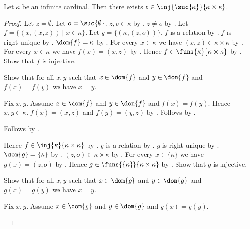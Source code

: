 \begin{proposition}\label{successor_injection_into_infinite_square}
    Let $\kappa$ be an infinite cardinal.
    Then there exists $e\in\inj{\suc{\kappa}}{\kappa\times\kappa}$.
\end{proposition}
\begin{proof}
    Let $z=\emptyset$.
    Let $o=\suc{\emptyset}$.
    $z,o\in\kappa$ by .
    $z\neq o$ by .
    Let $f=\{(x,(x,z))\mid x\in\kappa\}$.
    Let $g=\{(\kappa,(z,o))\}$.
    $f$ is a relation by .
    $f$ is right-unique by .
    $\dom{f}=\kappa$ by .
    For every $x\in\kappa$ we have $(x,z)\in\kappa\times\kappa$
        by .
    For every $x\in\kappa$ we have $f(x)=(x,z)$
        by .
    Hence $f\in\funs{\kappa}{\kappa\times\kappa}$
        by .
    Show that $f$ is injective.
    \begin{subproof}
        Show that for all $x,y$ such that $x\in\dom{f}$ and
            $y\in\dom{f}$ and $f(x)=f(y)$ we have $x=y$.
        \begin{subproof}
            Fix $x,y$.
            Assume $x\in\dom{f}$ and $y\in\dom{f}$ and $f(x)=f(y)$.
            Hence $x,y\in\kappa$.
            $f(x)=(x,z)$ and $f(y)=(y,z)$
                by .
            Follows by .
        \end{subproof}
        Follows by .
    \end{subproof}
    Hence $f\in\inj{\kappa}{\kappa\times\kappa}$
        by .
    $g$ is a relation by .
    $g$ is right-unique by .
    $\dom{g}=\{\kappa\}$
        by .
    $(z,o)\in\kappa\times\kappa$ by .
    For every $x\in\{\kappa\}$ we have $g(x)=(z,o)$
        by .
    Hence $g\in\funs{\{\kappa\}}{\kappa\times\kappa}$
        by .
    Show that $g$ is injective.
    \begin{subproof}
        Show that for all $x,y$ such that $x\in\dom{g}$ and
            $y\in\dom{g}$ and $g(x)=g(y)$ we have $x=y$.
        \begin{subproof}
            Fix $x,y$.
            Assume $x\in\dom{g}$ and $y\in\dom{g}$ and $g(x)=g(y)$.

\end{subproof}
\end{subproof}
\end{proof}
